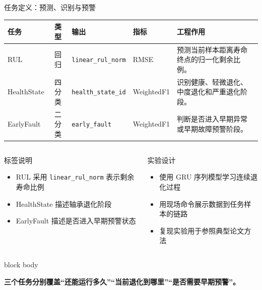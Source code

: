 \documentclass[aspectratio=169,11pt]{ctexbeamer}
\newcommand{\takeaway}[1]{%
  \vspace{0.18em}
  \begin{beamercolorbox}[wd=\linewidth,rounded=true,sep=0.58em]{block body}
    \parbox{\dimexpr\linewidth-1.16em\relax}{\raggedright\small\color{phmblue}\bfseries #1}
  \end{beamercolorbox}
}
\newcommand{\code}[1]{\texttt{#1}}
\begin{document}
\begin{frame}[t]{任务定义：预测、识别与预警}
  \begin{table}
    \scriptsize
    \begin{tabularx}{\linewidth}{lcllY}
      \toprule
      任务 & 类型 & 输出 & 指标 & 工程作用 \\
      \midrule
      RUL & 回归 & \code{linear\_rul\_norm} & RMSE & 预测当前样本距离寿命终点的归一化剩余比例。 \\
      HealthState & 四分类 & \code{health\_state\_id} & WeightedF1 & 识别健康、轻微退化、中度退化和严重退化阶段。 \\
      EarlyFault & 二分类 & \code{early\_fault} & WeightedF1 & 判断是否进入早期异常或早期故障预警阶段。 \\
      \bottomrule
    \end{tabularx}
  \end{table}

  \vspace{0.5em}
  \begin{columns}[T,onlytextwidth]
    \begin{column}{0.49\textwidth}
      \begin{block}{标签说明}
        \begin{itemize}
          \item RUL 采用 \code{linear\_rul\_norm} 表示剩余寿命比例
          \item HealthState 描述轴承退化阶段
          \item EarlyFault 描述是否进入早期预警状态
        \end{itemize}
      \end{block}
    \end{column}
    \begin{column}{0.49\textwidth}
      \begin{block}{实验设计}
        \begin{itemize}
          \item 使用 GRU 序列模型学习连续退化过程
          \item 用现场命令展示数据到任务样本的链路
          \item 复现实验用于参照典型论文方法
        \end{itemize}
      \end{block}
    \end{column}
  \end{columns}

  \takeaway{三个任务分别覆盖“还能运行多久”“当前退化到哪里”“是否需要早期预警”。}
\end{frame}
\end{document}
